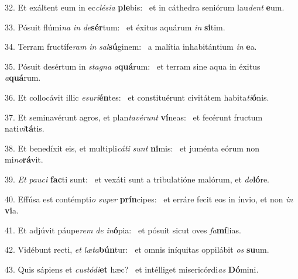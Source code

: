 32. Et exáltent eum in ec\textit{clé}\textit{si}\textit{a} \textbf{ple}bis: \ast\  et in cáthedra seniórum lau\textit{dent} \textbf{e}um.\

33. Pósuit flúmi\textit{na} \textit{in} \textit{de}\textbf{sér}tum: \ast\  et éxitus aquárum \textit{in} \textbf{si}tim.\

34. Terram fructífe\textit{ram} \textit{in} \textit{sal}\textbf{sú}ginem: \ast\  a malítia inhabitántium \textit{in} \textbf{e}a.\

35. Pósuit desértum in \textit{sta}\textit{gna} \textit{a}\textbf{quá}rum: \ast\  et terram sine aqua in éxitus \textit{a}\textbf{quá}rum.\

36. Et collocávit illic \textit{e}\textit{su}\textit{ri}\textbf{én}tes: \ast\  et constituérunt civitátem habita\textit{ti}\textbf{ó}nis.\

37. Et seminavérunt agros, et plan\textit{ta}\textit{vé}\textit{runt} \textbf{ví}neas: \ast\  et fecérunt fructum nati\textit{vi}\textbf{tá}tis.\

38. Et benedíxit eis, et multipli\textit{cá}\textit{ti} \textit{sunt} \textbf{ni}mis: \ast\  et juménta eórum non mi\textit{no}\textbf{rá}vit.\

39. \textit{Et} \textit{pau}\textit{ci} \textbf{fac}ti sunt: \ast\  et vexáti sunt a tribulatióne malórum, et \textit{do}\textbf{ló}re.\

40. Effúsa est contémpti\textit{o} \textit{su}\textit{per} \textbf{prín}cipes: \ast\  et erráre fecit eos in ínvio, et non \textit{in} \textbf{vi}a.\

41. Et adjúvit páupe\textit{rem} \textit{de} \textit{in}\textbf{ó}pia: \ast\  et pósuit sicut oves \textit{fa}\textbf{mí}lias.\

42. Vidébunt recti, \textit{et} \textit{læ}\textit{ta}\textbf{bún}tur: \ast\  et omnis iníquitas oppilábit \textit{os} \textbf{su}um.\

43. Quis sápiens et \textit{cus}\textit{tó}\textit{di}\textbf{et} hæc? \ast\  et intélliget misericórdi\textit{as} \textbf{Dó}mini.\

